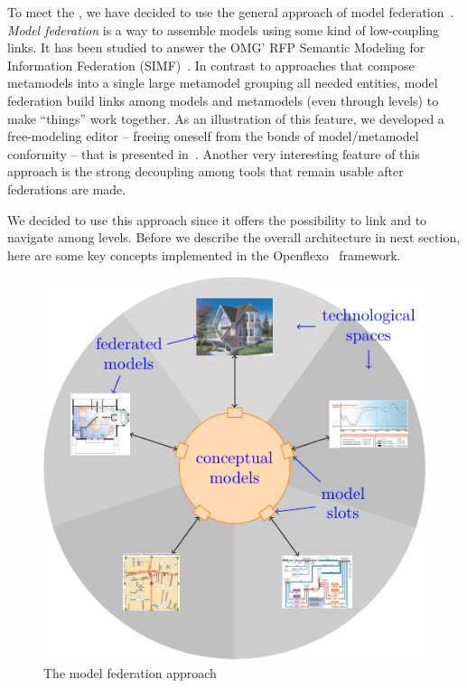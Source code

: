 

To meet the \mpc, we have decided to use the general
approach of model federation~\cite{Golra2016-federation}. \emph{Model
  federation} is a way to assemble models using some kind of
low-coupling links. It has been studied to answer the OMG' RFP
Semantic Modeling for Information Federation (SIMF)~\cite{simf}. In
contrast to approaches that compose metamodels into a single large
metamodel grouping all needed entities, model federation build links
among models and metamodels (even through levels) to make ``things''
work together. As an illustration of this feature, we developed a
free-modeling editor -- freeing oneself from the bonds of
model/metamodel conformity -- that is presented
in~\cite{models2016-freemodel}. Another very interesting feature of
this approach is the strong decoupling among tools that remain usable
after federations are made.

We decided to use this approach since it offers the possibility to
link and to navigate among levels. Before we describe the overall
architecture in next section, here are some key concepts implemented
in the Openflexo~\cite{openflexo_link} framework.


\begin{figure}[t]
    \centering
    \includegraphics[width=\columnwidth]{Figures/federation.pdf}
    \caption{The model federation approach}
    \label{fig:mf}
\end{figure}

